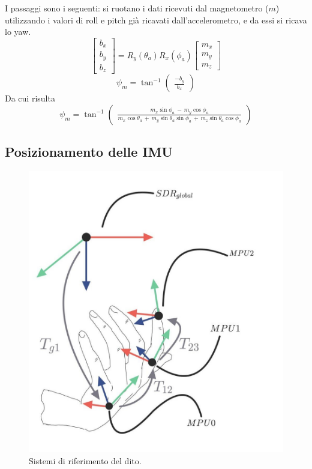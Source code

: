 I passaggi sono i seguenti: si ruotano i dati ricevuti dal magnetometro ($m$) utilizzando i valori di roll e pitch già ricavati dall'accelerometro, e da essi si ricava lo yaw.
\begin{equation*}
    \begin{bmatrix} b_x\\ b_y\\ b_z \end{bmatrix} = R_y(\theta_a) R_x(\phi_a) \begin{bmatrix} m_x\\ m_y\\ m_z \end{bmatrix}
\end{equation*}
\begin{equation*}
    \psi_m = \tan^{-1} \begin{pmatrix} \frac{-b_y}{b_x} \end{pmatrix}
\end{equation*}
Da cui risulta
\begin{equation}\label{eq psi yaw magn}
    \psi_m = \tan^{-1} \begin{pmatrix} \frac{m_x \sin{\phi_a} \, - \, m_y \cos{\phi_a}}{m_x \cos{\theta_a} \, + \, m_y \sin{\theta_a} \sin{\phi_a} \, + \, m_z \sin{\theta_a} \cos{\phi_a}} \end{pmatrix}
\end{equation}

\clearpage

\subsection{Posizionamento delle IMU}

\begin{figure}[H]
    \includegraphics[scale=0.25]{immagini/guanto_sdr.jpg}
    \centering
    \caption{Sistemi di riferimento del dito.}
\end{figure}

